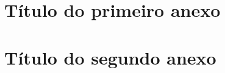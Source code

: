 \documentclass[12pt,a4paper,header]{abnt}
\begin{document}
\anexo



\chapter{Título do primeiro anexo}




\chapter{Título do segundo anexo}

\end{document}
